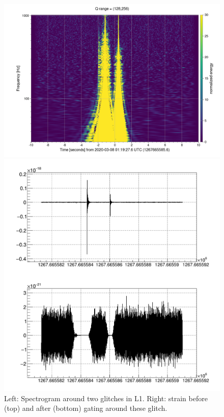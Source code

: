 %
\begin{figure}[ht]
  \centering
  \begin{minipage}{0.45\linewidth}
    \centering
    \includegraphics[width=1.2\linewidth]{sectionMBTA/1267665585.60_3.png}
  \end{minipage}
  \hfill
  \begin{minipage}{0.45\linewidth}
    \centering
    \includegraphics[width=0.9\linewidth]{sectionMBTA/StrainGated.png}
  \end{minipage}
  \caption{Left: Spectrogram around two glitches in L1. Right: strain before (top) and after (bottom) gating around these glitch.}
  \label{fig:strain_gated}
\end{figure}
